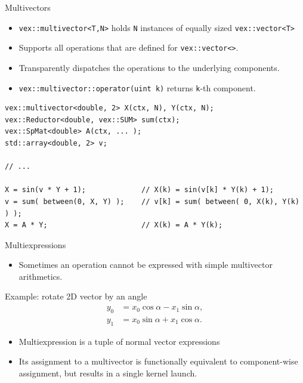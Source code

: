 \documentclass[@BEAMER_OPTIONS@]{beamer}
\newcommand{\code}[1]{\lstinline|#1|}
\begin{document}
\begin{frame}[fragile]{Multivectors}
    \begin{itemize}
        \item \code{vex::multivector<T,N>} holds \code{N} instances of equally
            sized \code{vex::vector<T>}
        \item Supports all operations that are defined for
            \code{vex::vector<>}.
        \item Transparently dispatches the operations to the underlying
            components.
        \item \code{vex::multivector::operator(uint k)} returns \code{k}-th
            component.
    \end{itemize}
    \begin{exampleblock}{}
        \begin{lstlisting}
vex::multivector<double, 2> X(ctx, N), Y(ctx, N);
vex::Reductor<double, vex::SUM> sum(ctx);
vex::SpMat<double> A(ctx, ... );
std::array<double, 2> v;

// ...

X = sin(v * Y + 1);             // X(k) = sin(v[k] * Y(k) + 1);
v = sum( between(0, X, Y) );    // v[k] = sum( between( 0, X(k), Y(k) ) );
X = A * Y;                      // X(k) = A * Y(k);
        \end{lstlisting}
    \end{exampleblock}
\end{frame}


\begin{frame}[fragile]{Multiexpressions}
    \begin{itemize}
        \item Sometimes an operation cannot be expressed with simple
            multivector arithmetics.
    \end{itemize}
    \begin{block}{Example: rotate 2D vector by an angle}
        \vspace{-1\baselineskip}
        \begin{align*}
            y_0 &= x_0 \cos \alpha - x_1 \sin \alpha, \\
            y_1 &= x_0 \sin \alpha + x_1 \cos \alpha.
        \end{align*}
    \end{block}

    \begin{itemize}
        \item Multiexpression is a tuple of normal vector expressions
        \item Its assignment to a multivector is functionally equivalent to
            component-wise assignment, but results in a single kernel launch.
    \end{itemize}
\end{frame}
\end{document}

